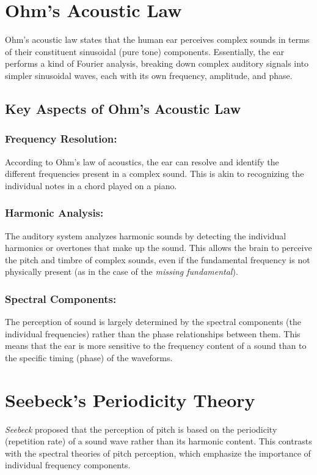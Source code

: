 \documentclass{article}
\begin{document}
\section{Ohm’s Acoustic Law}
Ohm's acoustic law states that the human ear perceives complex sounds in terms of their constituent sinusoidal (pure tone) components. Essentially, the ear performs a kind of Fourier analysis, breaking down complex auditory signals into simpler sinusoidal waves, each with its own frequency, amplitude, and phase.

\subsection{Key Aspects of Ohm's Acoustic Law}

\subsubsection{Frequency Resolution:}
According to Ohm's law of acoustics, the ear can resolve and identify the different frequencies present in a complex sound. This is akin to recognizing the individual notes in a chord played on a piano.

\subsubsection{Harmonic Analysis:}
The auditory system analyzes harmonic sounds by detecting the individual harmonics or overtones that make up the sound. This allows the brain to perceive the pitch and timbre of complex sounds, even if the fundamental frequency is not physically present (as in the case of the \textit{missing fundamental}).

\subsubsection{Spectral Components:}
The perception of sound is largely determined by the spectral components (the individual frequencies) rather than the phase relationships between them. This means that the ear is more sensitive to the frequency content of a sound than to the specific timing (phase) of the waveforms.


\section{Seebeck's Periodicity Theory}

\textit{Seebeck} proposed that the perception of pitch is based on the periodicity (repetition rate) of a sound wave rather than its harmonic content. This contrasts with the spectral theories of pitch perception, which emphasize the importance of individual frequency components.
\end{document}
